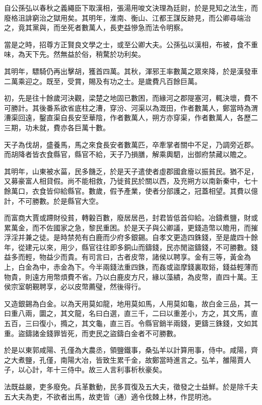 自公孫弘以春秋之義繩臣下取漢相，張湯用唆文決理為廷尉，於是見知之法生，而廢格沮誹窮治之獄用矣。其明年，淮南、衡山、江都王謀反跡見，而公卿尋端治之，竟其黨與，而坐死者數萬人，長吏益慘急而法令明察。

當是之時，招尊方正賢良文學之士，或至公卿大夫。公孫弘以漢相，布被，食不重味，為天下先。然無益於俗，稍騖於功利矣。

其明年，驃騎仍再出擊胡，獲首四萬。其秋，渾邪王率數萬之眾來降，於是漢發車二萬乘迎之。既至，受賞，賜及有功之士。是歲費凡百餘巨萬。

初，先是往十餘歲河決觀，梁楚之地固已數困，而緣河之郡隄塞河，輒決壞，費不可勝計。其後番系欲省底柱之漕，穿汾、河渠以為溉田，作者數萬人，鄭當時為渭漕渠回遠，鑿直渠自長安至華陰，作者數萬人，朔方亦穿渠，作者數萬人，各歷二三期，功未就，費亦各巨萬十數。

天子為伐胡，盛養馬，馬之來食長安者數萬匹，卒牽掌者關中不足，乃調旁近郡。而胡降者皆衣食縣官，縣官不給，天子乃損膳，解乘輿駟，出御府禁藏以贍之。

其明年，山東被水菑，民多饑乏，於是天子遣使者虛郡國倉廥以振貧民。猶不足，又募豪富人相貸假。尚不能相救，乃徙貧民於關以西，及充朔方以南新秦中，七十餘萬口，衣食皆仰給縣官。數歲，假予產業，使者分部護之，冠蓋相望。其費以億計，不可勝數。於是縣官大空。

而富商大賈或蹛財役貧，轉轂百數，廢居居邑，封君皆低首仰給。冶鑄煮鹽，財或累萬金，而不佐國家之急，黎民重困。於是天子與公卿議，更錢造幣以贍用，而摧浮淫并兼之徒。是時禁苑有白鹿而少府多銀錫。自孝文更造四銖錢，至是歲四十餘年，從建元以來，用少，縣官往往即多銅山而鑄錢，民亦閒盜鑄錢，不可勝數。錢益多而輕，物益少而貴。有司言曰，古者皮幣，諸侯以聘享。金有三等，黃金為上，白金為中，赤金為下。今半兩錢法重四銖，而姦或盜摩錢裏取鋊，錢益輕薄而物貴，則遠方用幣煩費不省。乃以白鹿皮方尺，緣以藻繢，為皮幣，直四十萬。王侯宗室朝覲聘享，必以皮幣薦璧，然後得行。

又造銀錫為白金。以為天用莫如龍，地用莫如馬，人用莫如龜，故白金三品，其一曰重八兩，圜之，其文龍，名曰白選，直三千，二曰以重差小，方之，其文馬，直五百，三曰復小，撱之，其文龜，直三百。令縣官銷半兩錢，更鑄三銖錢，文如其重。盜鑄諸金錢罪皆死，而吏民之盜鑄白金者不可勝數。

於是以東郭咸陽、孔僅為大農丞，領鹽鐵事，桑弘羊以計算用事，侍中。咸陽，齊之大煮鹽，孔僅，南陽大冶，皆致生累千金，故鄭當時進言之。弘羊，雒陽賈人子，以心計，年十三侍中。故三人言利事析秋豪矣。

法既益嚴，吏多廢免。兵革數動，民多買復及五大夫，徵發之士益鮮。於是除千夫五大夫為吏，不欲者出馬，故吏皆（通）適令伐棘上林，作昆明池。

